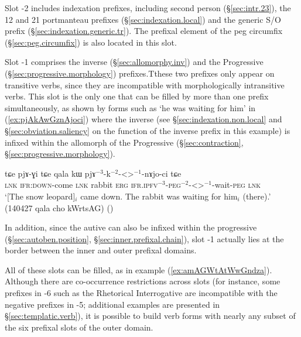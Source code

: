 Slot -2 includes indexation prefixes, including second person  (§\ref{sec:intr.23}), the  1\fl{}2  and  2\fl{}1 portmanteau prefixes (§\ref{sec:indexation.local}) and the generic S/O prefix  (§\ref{sec:indexation.generic.tr}). The prefixal element  of the peg circumfix (§\ref{sec:peg.circumfix}) is also located in this slot.

Slot -1 comprises the inverse  (§\ref{sec:allomorphy.inv}) and the Progressive  (§\ref{sec:progressive.morphology}) prefixes.Tthese two prefixes only appear on transitive verbs, since they are incompatible with morphologically intransitive verbs. This slot is the only one that can be filled by more than one prefix simultaneously, as shown by forms such as  `he was waiting for him' in (\ref{ex:pjAkAwGznAjoci}) where the inverse  (see §\ref{sec:indexation.non.local} and §\ref{sec:obviation.saliency} on the function of the inverse prefix in this example) is infixed within the  allomorph of the Progressive (§\ref{sec:contraction}, §\ref{sec:progressive.morphology}).

\begin{exe}
\ex \label{ex:pjAkAwGznAjoci}
\gll   tɕe pjɤ-ɣi tɕe qala kɯ pjɤ$^{-3}$-k$^{-2}$-<>$^{-1}$-nɤjo-ci  tɕe\\
\textsc{lnk} \textsc{ifr}:\textsc{down}-come \textsc{lnk} rabbit \textsc{erg} \textsc{ifr}.\textsc{ipfv}$^{-3}$-\textsc{peg}$^{-2}$-<>$^{-1}$-wait-\textsc{peg} \textsc{lnk}  \\
\glt `[The snow leopard]$_i$ came down.  The rabbit was waiting for him$_i$ (there).' (140427 qala cho kWrtsAG) 	()
\end{exe}

In addition, since the autive  can also be infixed within the progressive (§\ref{sec:autoben.position}, §\ref{sec:inner.prefixal.chain}), slot -1 actually lies at the border between the inner and outer prefixal domains.

All of these slots can be filled, as in example (\ref{ex:amAGWtAtWwGndza}). Although there are co-occur\-rence restrictions across slots (for instance, some prefixes in -6 such as the Rhetorical Interrogative  are incompatible with the negative prefixes in -5; additional examples are presented in §\ref{sec:templatic.verb}), it is possible to build verb forms with nearly any subset of the six prefixal slots of the outer domain.


